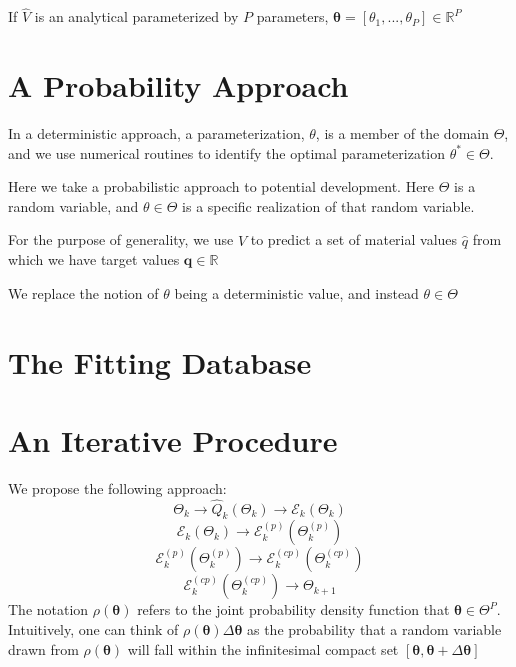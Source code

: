 If $\hat{V}$ is an analytical parameterized by $P$ parameters, $\bm{\theta}=[\theta_1,...,\theta_P]\in\mathbb{R}^P$

\section{A Probability Approach}

In a deterministic approach, a parameterization, $\theta$, is a member of the domain $\Theta$, and we use numerical routines to identify the optimal parameterization $\theta^*\in\Theta$.

Here we take a probabilistic approach to potential development.
Here $\Theta$ is a random variable, and $\theta\in\Theta$ is a specific realization of that random variable.

For the purpose of generality, we use $\hat{V}$ to predict a set of material values $\hat{q}$ from which we have target values $\bm{q}\in\mathbb{R}$


We replace the notion of $\theta$ being a deterministic value, and instead $\theta\in\Theta$

\section{The Fitting Database}

\section{An Iterative Procedure}
We propose the following approach:
\begin{equation}
	\Theta_k \rightarrow \hat{Q}_k(\Theta_k) \rightarrow \mathcal{E}_k(\Theta_k)
\end{equation}
\begin{equation}
	\mathcal{E}_k(\Theta_k) \rightarrow \mathcal{E}_k^{(p)}(\Theta_k^{(p)})
\end{equation}
\begin{equation}
	\mathcal{E}_k^{(p)}(\Theta_k^{(p)}) \rightarrow \mathcal{E}_k^{(cp)}(\Theta_k^{(cp)})
\end{equation}
\begin{equation}
	      \mathcal{E}_k^{(cp)}(\Theta_k^{(cp)}) \rightarrow \Theta_{k+1}
\end{equation}
The notation $\rho(\bm{\theta})$ refers to the joint probability density function that $\bm{\theta} \in \Theta^{P}$.
Intuitively, one can think of
$\rho(\bm{\theta})\Delta\bm{\theta}$
as the probability that a random variable drawn from $\rho(\bm{\theta})$ will fall within the infinitesimal compact set $[\bm{\theta},\bm{\theta}+\Delta\bm{\theta}]$

